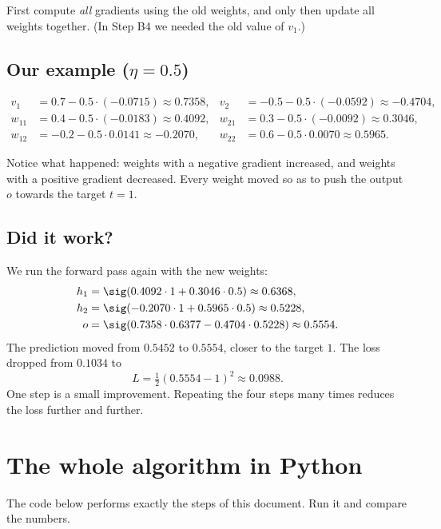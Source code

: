 \begin{keyidea}[Important]
First compute \emph{all} gradients using the old weights, and only then update all weights together. (In Step B4 we needed the old value of $v_1$.)
\end{keyidea}

\subsection*{Our example ($\eta=0.5$)}
\begin{align*}
v_1&=0.7-0.5\cdot(-0.0715)\approx0.7358, & v_2&=-0.5-0.5\cdot(-0.0592)\approx-0.4704,\\
w_{11}&=0.4-0.5\cdot(-0.0183)\approx0.4092, & w_{21}&=0.3-0.5\cdot(-0.0092)\approx0.3046,\\
w_{12}&=-0.2-0.5\cdot0.0141\approx-0.2070, & w_{22}&=0.6-0.5\cdot0.0070\approx0.5965.
\end{align*}

Notice what happened: weights with a negative gradient increased, and weights with a positive gradient decreased. Every weight moved so as to push the output $o$ towards the target $t=1$.

\subsection*{Did it work?}
We run the forward pass again with the new weights:
\begin{align*}
h_1&=\sig(0.4092\cdot1+0.3046\cdot0.5)\approx0.6368,\\
h_2&=\sig(-0.2070\cdot1+0.5965\cdot0.5)\approx0.5228,\\
o&=\sig(0.7358\cdot0.6377-0.4704\cdot0.5228)\approx0.5554.
\end{align*}
The prediction moved from $0.5452$ to $0.5554$, closer to the target $1$. The loss dropped from $0.1034$ to
\[
L=\tfrac12(0.5554-1)^2\approx0.0988.
\]
One step is a small improvement. Repeating the four steps many times reduces the loss further and further.

\section{The whole algorithm in Python}

The code below performs exactly the steps of this document. Run it and compare the numbers.

